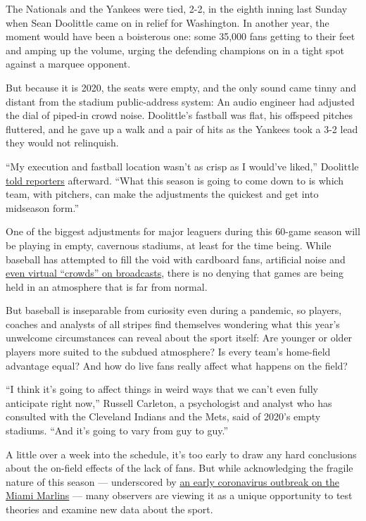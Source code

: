 The Nationals and the Yankees were tied, 2-2, in the eighth inning last
Sunday when Sean Doolittle came on in relief for Washington. In another
year, the moment would have been a boisterous one: some 35,000 fans
getting to their feet and amping up the volume, urging the defending
champions on in a tight spot against a marquee opponent.

But because it is 2020, the seats were empty, and the only sound came
tinny and distant from the stadium public-address system: An audio
engineer had adjusted the dial of piped-in crowd noise. Doolittle's
fastball was flat, his offspeed pitches fluttered, and he gave up a walk
and a pair of hits as the Yankees took a 3-2 lead they would not
relinquish.

``My execution and fastball location wasn't as crisp as I would've
liked,'' Doolittle
\href{https://www.nbcwashington.com/news/sports/nbcsports/nationals-bullpen-provides-that-old-familiar-feeling-for-a-day/2372928/}{told
reporters} afterward. ``What this season is going to come down to is
which team, with pitchers, can make the adjustments the quickest and get
into midseason form.''

One of the biggest adjustments for major leaguers during this 60-game
season will be playing in empty, cavernous stadiums, at least for the
time being. While baseball has attempted to fill the void with cardboard
fans, artificial noise and
\href{https://www.youtube.com/watch?v=q_FQcKH4xL4}{even virtual
``crowds'' on broadcasts}, there is no denying that games are being held
in an atmosphere that is far from normal.

But baseball is inseparable from curiosity even during a pandemic, so
players, coaches and analysts of all stripes find themselves wondering
what this year's unwelcome circumstances can reveal about the sport
itself: Are younger or older players more suited to the subdued
atmosphere? Is every team's home-field advantage equal? And how do live
fans really affect what happens on the field?

``I think it's going to affect things in weird ways that we can't even
fully anticipate right now,'' Russell Carleton, a psychologist and
analyst who has consulted with the Cleveland Indians and the Mets, said
of 2020's empty stadiums. ``And it's going to vary from guy to guy.''

A little over a week into the schedule, it's too early to draw any hard
conclusions about the on-field effects of the lack of fans. But while
acknowledging the fragile nature of this season --- underscored by
\href{https://www.nytimes3xbfgragh.onion/2020/07/27/sports/baseball/marlins-game-canceled.html}{an
early coronavirus outbreak on the Miami Marlins} --- many observers are
viewing it as a unique opportunity to test theories and examine new data
about the sport.

